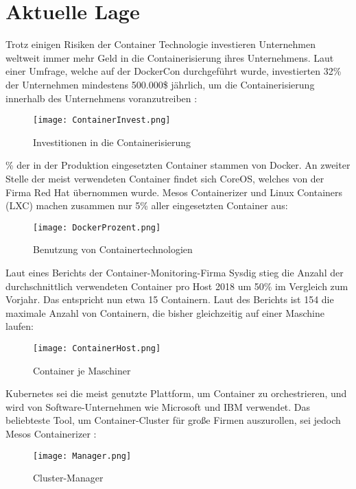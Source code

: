 \section{Aktuelle Lage}
\label{sec:AktuelleLage}
Trotz einigen Risiken der Container Technologie investieren Unternehmen weltweit immer mehr Geld in die Containerisierung ihres Unternehmens. Laut einer Umfrage, welche auf der DockerCon durchgeführt wurde, investierten 32\% der Unternehmen mindestens 500.000\$ jährlich, um die Containerisierung innerhalb des Unternehmens voranzutreiben \cite{Investments}:
\begin{figure}[H]
	\begin{center}
		\texttt{[image: ContainerInvest.png]}
	\end{center}
	\caption[Investitionen in die Containerisierung]{Investitionen in die Containerisierung \footnotemark}
	\label{fig:HW1}
\end{figure}
\% der in der Produktion eingesetzten Container stammen von Docker. An zweiter Stelle der meist verwendeten Container findet sich CoreOS, welches von der Firma Red Hat übernommen wurde. Mesos Containerizer und Linux Containers (LXC) machen zusammen nur 5\% aller eingesetzten Container aus:
\begin{figure}[H]
	\begin{center}
		\texttt{[image: DockerProzent.png]}
	\end{center}
	\caption[Benutzung von Containertechnologien]{Benutzung von Containertechnologien \footnotemark}
	\label{fig:HW1}
\end{figure}
Laut eines Berichts der Container-Monitoring-Firma Sysdig stieg die Anzahl der durchschnittlich verwendeten Container pro Host 2018 um 50\% im Vergleich zum Vorjahr. Das entspricht nun etwa 15 Containern. Laut des Berichts ist 154 die maximale Anzahl von Containern, die bisher gleichzeitig auf einer Maschine laufen:
\begin{figure}[H]
	\begin{center}
		\texttt{[image: ContainerHost.png]}
	\end{center}
	\caption[Container je Maschine]{Container je Maschiner \footnotemark}
	\label{fig:HW1}
\end{figure}
\newpage
Kubernetes sei die meist genutzte Plattform, um Container zu orchestrieren, und wird von Software-Unternehmen wie Microsoft und IBM verwendet. Das beliebteste Tool, um Container-Cluster für große Firmen auszurollen, sei jedoch Mesos Containerizer \cite{stats}:
\begin{figure}[H]
	\begin{center}
		\texttt{[image: Manager.png]}
	\end{center}
	\caption[Cluster-Manager]{Cluster-Manager \footnotemark}
	\label{fig:HW1}
\end{figure}

